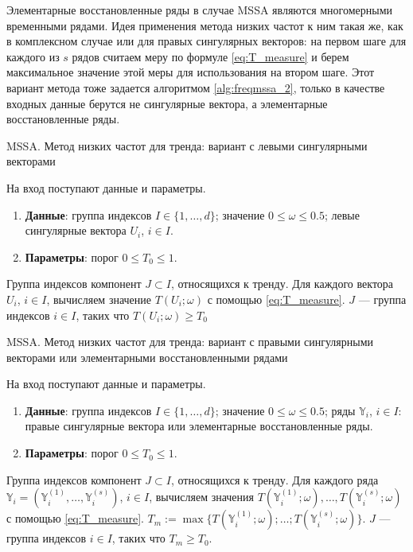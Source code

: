 \documentclass[specialist,
               substylefile = spbu.rtx,
               subf,href,colorlinks=true, 12pt]{disser}
\begin{document}
Элементарные восстановленные ряды в случае MSSA являются многомерными временными рядами. Идея применения метода низких частот к ним такая же, как в комплексном случае или для правых сингулярных векторов: на первом шаге для каждого из $s$ рядов считаем меру по формуле \eqref{eq:T_measure} и берем максимальное значение этой меры для использования на втором шаге.
Этот вариант метода тоже задается алгоритмом  \ref{alg:freqmssa_2}, только в качестве входных данные берутся не сингулярные вектора, а элементарные восстановленные ряды.

 \begin{algorithm}[!hhh]
\caption{MSSA. Метод низких частот для тренда: вариант с левыми сингулярными векторами}
\label{alg:freqmssa_1}
\begin{algorithmic}[1]
\REQUIRE На вход поступают данные и параметры.
\begin{enumerate}
\item \textbf{Данные}: группа индексов $I \in \{1,\ldots,d\}$; значение  $0 \leqslant  \omega \leqslant 0.5$; левые сингулярные вектора $U_i$, $i \in I$.
\item \textbf{Параметры}: порог $0 \leqslant T_0 \leqslant 1$.
\end{enumerate}
\ENSURE Группа индексов компонент $J \subset I$, относящихся к тренду.
\STATE  Для каждого вектора $U_i$, $i \in I$, вычисляем значение $T(U_i; \omega)$ с помощью  \eqref{eq:T_measure}.
\STATE $J$ --- группа индексов $i \in I$, таких что $T(U_i; \omega) \geqslant T_0$
\end{algorithmic}
\end{algorithm}

\begin{algorithm}[!hhh]
\caption{MSSA. Метод низких частот для тренда: вариант с правыми сингулярными векторами или элементарными восстановленными рядами}
\label{alg:freqmssa_2}
\begin{algorithmic}[1]
\REQUIRE На вход поступают данные и параметры.
\begin{enumerate}
\item \textbf{Данные}: группа индексов $I \in \{1,\ldots,d\}$; значение  $0 \leqslant  \omega \leqslant 0.5$; ряды $\mathbb{Y}_i$, $i \in I$: 
правые сингулярные вектора или элементарные восстановленные ряды.
\item \textbf{Параметры}: порог $0 \leqslant T_0 \leqslant 1$.
\end{enumerate}
\ENSURE Группа индексов компонент $J \subset I$, относящихся к тренду.
\STATE  Для каждого ряда $\mathbb{Y}_{i} = (\mathbb{Y}_i^{(1)}, \ldots, \mathbb{Y}_i^{(s)})$, $i \in I$, вычисляем значения $T(\mathbb{Y}_i^{(1)}; \omega), \ldots,
T(\mathbb{Y}_i^{(s)}; \omega)$ с помощью  \eqref{eq:T_measure}. $T_m := \max \{T(\mathbb{Y}_i^{(1)}; \omega); \ldots;
T(\mathbb{Y}_i^{(s)}; \omega)\}$.
\STATE $J$ --- группа индексов $i \in I$, таких что $T_m \geqslant T_0$.
\end{algorithmic}
\end{algorithm}
\end{document}
